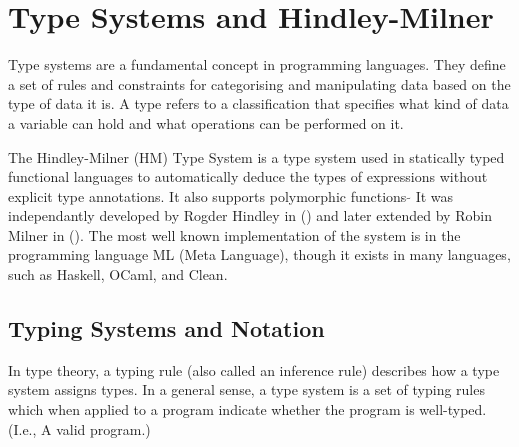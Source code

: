 \documentclass{l4proj}
\begin{document}
\section{Type Systems and Hindley-Milner}



Type systems are a fundamental concept in programming languages.
They define a set of rules and constraints for categorising and manipulating data based on the type of data it is.
A type refers to a classification that specifies what kind of data a variable can hold and what operations can be performed on it.


The Hindley-Milner (HM) Type System is a type system used in statically typed functional languages to automatically deduce the types of expressions without explicit type annotations.
It also supports polymorphic functions 
$\tilde{}$ It was independantly developed by Rogder Hindley in () and later extended by Robin Milner in ().
The most well known implementation of the system is in the programming language ML (Meta Language), though it exists in many languages, such as Haskell, OCaml, and Clean.

\subsection{Typing Systems and Notation} \label{subsec:typing-systems-and-notation}

In type theory, a typing rule (also called an inference rule) describes how a type system assigns types.
In a general sense, a type system is a set of typing rules which when applied to a program indicate whether the program is well-typed. (I.e., A valid program.)
\end{document}
